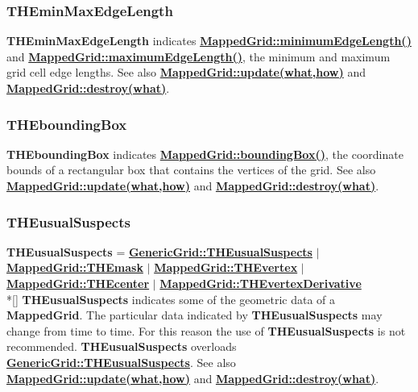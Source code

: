 \documentclass{article}
\begin{document}
  \subsubsection{THEminMaxEdgeLength}
  \label{MappedGrid::THEminMaxEdgeLength}
    \textbf{THEminMaxEdgeLength} indicates {\bf{}\hyperref{minimumEdgeLength()}{minimumEdgeLength() \rm(\S}{)}{MappedGrid::minimumEdgeLength()}}
    and {\bf{}\hyperref{maximumEdgeLength()}{maximumEdgeLength() \rm(\S}{)}{MappedGrid::maximumEdgeLength()}},
    the minimum and maximum grid cell edge lengths.
    See also {\bf{}\hyperref{update(what,how)}{update(what,how) \rm(\S}{)}{MappedGrid::update(what,how)}}
    and {\bf{}\hyperref{destroy(what)}{destroy(what) \rm(\S}{)}{MappedGrid::destroy(what)}}.

  \subsubsection{THEboundingBox}
  \label{MappedGrid::THEboundingBox}
    \textbf{THEboundingBox} indicates {\bf{}\hyperref{boundingBox()}{boundingBox() \rm(\S}{)}{MappedGrid::boundingBox()}},
    the coordinate bounds of a rectangular box that contains the vertices of the grid.
    See also {\bf{}\hyperref{update(what,how)}{update(what,how) \rm(\S}{)}{MappedGrid::update(what,how)}}
    and {\bf{}\hyperref{destroy(what)}{destroy(what) \rm(\S}{)}{MappedGrid::destroy(what)}}.

  \subsubsection{THEusualSuspects}
  \label{MappedGrid::THEusualSuspects}
    \textbf{THEusualSuspects}
    =      {\bf{}\hyperref{GenericGrid::THEusualSuspects}{GenericGrid::THEusualSuspects \rm(\S}{)}{GenericGrid::THEusualSuspects}}
    $\mid$ {\bf{}\hyperref{THEmask}{THEmask \rm(\S}{)}{MappedGrid::THEmask}}
    $\mid$ {\bf{}\hyperref{THEvertex}{THEvertex \rm(\S}{)}{MappedGrid::THEvertex}}
    $\mid$ {\bf{}\hyperref{THEcenter}{THEcenter \rm(\S}{)}{MappedGrid::THEcenter}}
    $\mid$ {\bf{}\hyperref{THEvertexDerivative}{THEvertexDerivative \rm(\S}{)}{MappedGrid::THEvertexDerivative}} \\*[\parskip]
    \textbf{THEusualSuspects} indicates some of the geometric data of a \textbf{MappedGrid}.
    The particular data indicated by \textbf{THEusualSuspects} may change from time to time.
    For this reason the use of \textbf{THEusualSuspects} is not recommended.
    \textbf{THEusualSuspects} overloads
    {\bf{}\hyperref{GenericGrid::THEusualSuspects}{GenericGrid::THEusualSuspects \rm(\S}{)}{GenericGrid::THEusualSuspects}}.
    See also {\bf{}\hyperref{update(what,how)}{update(what,how) \rm(\S}{)}{MappedGrid::update(what,how)}}
    and {\bf{}\hyperref{destroy(what)}{destroy(what) \rm(\S}{)}{MappedGrid::destroy(what)}}.
\end{document}
